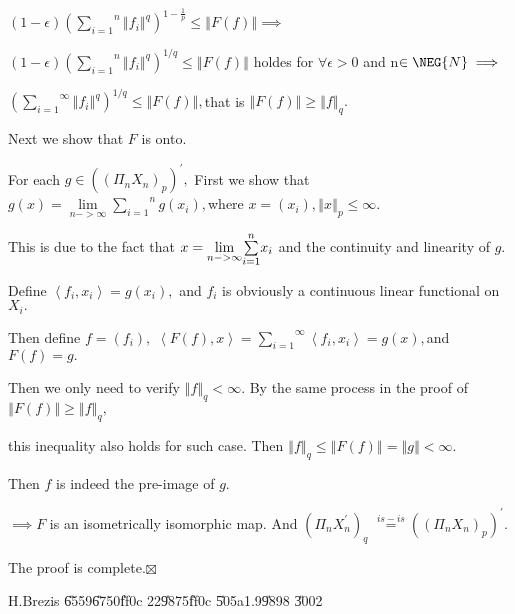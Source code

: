 \documentclass{article}
\begin{document}
$\left( 1-\epsilon \right) \left( \overset{n}{\underset{i=1}{\sum }}%
\left\Vert f_{i}\right\Vert ^{q}\right) ^{1-\frac{1}{p}}\leq \left\Vert
F\left( f\right) \right\Vert \implies $

$\left( 1-\epsilon \right) \left( \overset{n}{\underset{i=1}{\sum }}%
\left\Vert f_{i}\right\Vert ^{q}\right) ^{1/q}\leq \left\Vert F\left(
f\right) \right\Vert $ holdes for $\forall \epsilon >0$ and n$\in \NEG%
{N}\implies $

$\left( \overset{\infty }{\underset{i=1}{\sum }}\left\Vert f_{i}\right\Vert
^{q}\right) ^{1/q}\leq \left\Vert F\left( f\right) \right\Vert ,$that is $%
\left\Vert F\left( f\right) \right\Vert \geq \left\Vert f\right\Vert _{q}.$

Next we show that $F$ is onto.

For each $g\in \left( \left( \Pi _{n}X_{n}\right) _{p}\right) ^{\prime },$%
First we show that $g\left( x\right) =\underset{n->\infty }{\lim }\overset{n}%
{\underset{i=1}{\sum }}g\left( x_{i}\right) ,$where $x=\left( x_{i}\right)
,\left\Vert x\right\Vert _{p}\leq \infty .$

This is due to the fact that $x=\underset{n->\infty }{\lim }\overset{n}{%
\underset{i=1}{\sum }}x_{i}$ and the continuity and linearity of $g.$

Define $\left\langle f_{i},x_{i}\right\rangle =g\left( x_{i}\right) ,$ and $%
f_{i}$ is obviously a continuous linear functional on $X_{i}.$

Then define $f=\left( f_{i}\right) ,$ $\left\langle F\left( f\right)
,x\right\rangle =\overset{\infty }{\underset{i=1}{\sum }}\left\langle
f_{i},x_{i}\right\rangle =g\left( x\right) ,$and $F\left( f\right) =g.$

Then we only need to verify $\left\Vert f\right\Vert _{q}<\infty .$ By the
same process in the proof of $\left\Vert F\left( f\right) \right\Vert \geq
\left\Vert f\right\Vert _{q},$

this inequality also holds for such case. Then $\left\Vert f\right\Vert
_{q}\leq \left\Vert F\left( f\right) \right\Vert =\left\Vert g\right\Vert
<\infty .$

\bigskip Then $f$ is indeed the pre-image of $g.$

$\implies F$ is an isometrically isomorphic map. And $\left( \Pi
_{n}X_{n}^{\prime }\right) _{q}$ $\overset{is-is}{=}\left( \left( \Pi
_{n}X_{n}\right) _{p}\right) ^{\prime }.$

The proof is complete.$\boxtimes $

H.Brezis \U{6559}\U{6750}\U{ff0c} 22\U{9875}\U{ff0c} \U{505a}1.9\U{9898}%
\U{3002}
\end{document}
